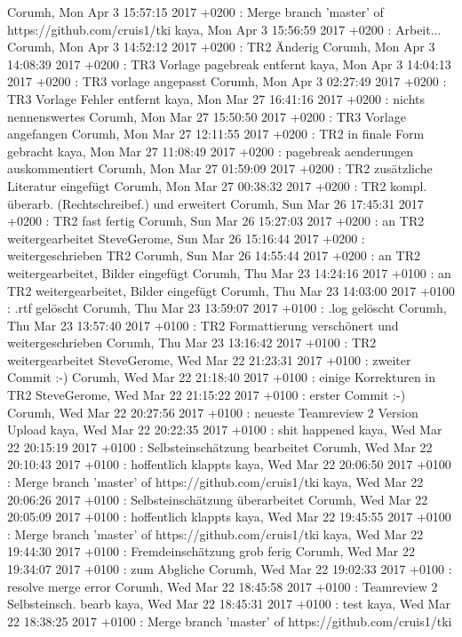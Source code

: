 Corumh, Mon Apr 3 15:57:15 2017 +0200 : Merge branch 'master' of https://github.com/cruis1/tki
kaya, Mon Apr 3 15:56:59 2017 +0200 : Arbeit...
Corumh, Mon Apr 3 14:52:12 2017 +0200 : TR2 Änderig
Corumh, Mon Apr 3 14:08:39 2017 +0200 : TR3 Vorlage pagebreak entfernt
kaya, Mon Apr 3 14:04:13 2017 +0200 : TR3 vorlage angepasst
Corumh, Mon Apr 3 02:27:49 2017 +0200 : TR3 Vorlage Fehler entfernt
kaya, Mon Mar 27 16:41:16 2017 +0200 : nichts nennenswertes
Corumh, Mon Mar 27 15:50:50 2017 +0200 : TR3 Vorlage angefangen
Corumh, Mon Mar 27 12:11:55 2017 +0200 : TR2 in finale Form gebracht
kaya, Mon Mar 27 11:08:49 2017 +0200 : pagebreak aenderungen auskommentiert
Corumh, Mon Mar 27 01:59:09 2017 +0200 : TR2 zusätzliche Literatur eingefügt
Corumh, Mon Mar 27 00:38:32 2017 +0200 : TR2 kompl. überarb. (Rechtschreibef.) und erweitert
Corumh, Sun Mar 26 17:45:31 2017 +0200 : TR2 fast fertig
Corumh, Sun Mar 26 15:27:03 2017 +0200 : an TR2 weitergearbeitet
SteveGerome, Sun Mar 26 15:16:44 2017 +0200 : weitergeschrieben TR2
Corumh, Sun Mar 26 14:55:44 2017 +0200 : an TR2 weitergearbeitet, Bilder eingefügt
Corumh, Thu Mar 23 14:24:16 2017 +0100 : an TR2 weitergearbeitet, Bilder eingefügt
Corumh, Thu Mar 23 14:03:00 2017 +0100 : .rtf gelöscht
Corumh, Thu Mar 23 13:59:07 2017 +0100 : .log gelöscht
Corumh, Thu Mar 23 13:57:40 2017 +0100 : TR2 Formattierung verschönert und weitergeschrieben
Corumh, Thu Mar 23 13:16:42 2017 +0100 : TR2 weitergearbeitet
SteveGerome, Wed Mar 22 21:23:31 2017 +0100 : zweiter Commit :-)
Corumh, Wed Mar 22 21:18:40 2017 +0100 : einige Korrekturen in TR2
SteveGerome, Wed Mar 22 21:15:22 2017 +0100 : erster Commit :-)
Corumh, Wed Mar 22 20:27:56 2017 +0100 : neueste Teamreview 2 Version Upload
kaya, Wed Mar 22 20:22:35 2017 +0100 : shit happened
kaya, Wed Mar 22 20:15:19 2017 +0100 : Selbsteinschätzung bearbeitet
Corumh, Wed Mar 22 20:10:43 2017 +0100 : hoffentlich klappts
kaya, Wed Mar 22 20:06:50 2017 +0100 : Merge branch 'master' of https://github.com/cruis1/tki
kaya, Wed Mar 22 20:06:26 2017 +0100 : Selbsteinschätzung überarbeitet
Corumh, Wed Mar 22 20:05:09 2017 +0100 : hoffentlich klappts
kaya, Wed Mar 22 19:45:55 2017 +0100 : Merge branch 'master' of https://github.com/cruis1/tki
kaya, Wed Mar 22 19:44:30 2017 +0100 : Fremdeinschätzung grob ferig
Corumh, Wed Mar 22 19:34:07 2017 +0100 : zum Abgliche
Corumh, Wed Mar 22 19:02:33 2017 +0100 : resolve merge error
Corumh, Wed Mar 22 18:45:58 2017 +0100 : Teamreview 2 Selbsteinsch. bearb
kaya, Wed Mar 22 18:45:31 2017 +0100 : test
kaya, Wed Mar 22 18:38:25 2017 +0100 : Merge branch 'master' of https://github.com/cruis1/tki
